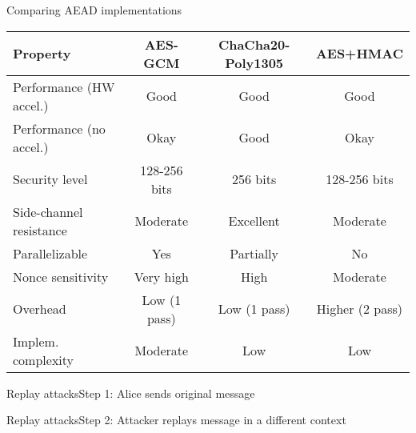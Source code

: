 \documentclass[aspectratio=169, lualatex, handout]{beamer}
\begin{document}
\begin{frame}{Comparing AEAD implementations}
	\begin{center}
		\begin{tabular}{|l|c|c|c|}
			\hline
			\textbf{Property}       & \textbf{AES-GCM} & \textbf{ChaCha20-Poly1305} & \textbf{AES+HMAC} \\
			\hline
			Performance (HW accel.) & Good             & Good                       & Good              \\
			\hline
			Performance (no accel.) & Okay             & Good                       & Okay              \\
			\hline
			Security level          & 128-256 bits     & 256 bits                   & 128-256 bits      \\
			\hline
			Side-channel resistance & Moderate         & Excellent                  & Moderate          \\
			\hline
			Parallelizable          & Yes              & Partially                  & No                \\
			\hline
			Nonce sensitivity       & Very high        & High                       & Moderate          \\
			\hline
			Overhead                & Low (1 pass)     & Low (1 pass)               & Higher (2 pass)   \\
			\hline
			Implem. complexity      & Moderate         & Low                        & Low               \\
			\hline
		\end{tabular}
	\end{center}
\end{frame}

\begin{frame}{Replay attacks}{Step 1: Alice sends original message}
\end{frame}

\begin{frame}{Replay attacks}{Step 2: Attacker replays message in a different context}
\end{frame}
\end{document}
